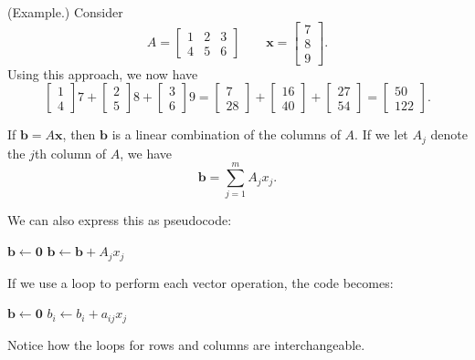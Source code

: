 \documentclass[letterpaper]{article}
\begin{document}
\begin{mdframed}
    (Example.) Consider
    \[A = \begin{bmatrix}
        1 & 2 & 3 \\ 
        4 & 5 & 6
    \end{bmatrix} \qquad \mathbf{x} = \begin{bmatrix}
        7 \\ 8 \\ 9
    \end{bmatrix}.\]
    Using this approach, we now have 
    \[\begin{bmatrix}
        1 \\ 4
    \end{bmatrix} 7 + \begin{bmatrix}
        2 \\ 5
    \end{bmatrix} 8 + \begin{bmatrix}
        3 \\ 6
    \end{bmatrix} 9 = \begin{bmatrix}
        7 \\ 28
    \end{bmatrix} + \begin{bmatrix}
        16 \\ 40
    \end{bmatrix} + \begin{bmatrix}
        27 \\ 54
    \end{bmatrix} = \begin{bmatrix}
        50 \\ 122
    \end{bmatrix}.\]
\end{mdframed}

\begin{proposition}
    If $\mathbf{b} = A\mathbf{x}$, then $\mathbf{b}$ is a linear combination of the columns of $A$. If we let $A_j$ denote the $j$th column of $A$, we have 
    \[\mathbf{b} = \sum_{j = 1}^{m} A_j x_j.\]
\end{proposition}
We can also express this as pseudocode: 
\begin{algorithmic}
    \State $\mathbf{b} \gets \mathbf{0}$
        \State $\mathbf{b} \gets \mathbf{b} + A_j x_j$
    \EndFor
\end{algorithmic}
If we use a loop to perform each vector operation, the code becomes:
\begin{algorithmic}
    \State $\mathbf{b} \gets \mathbf{0}$
            \State $b_i \gets b_i + a_{ij} x_j$
        \EndFor 
    \EndFor
\end{algorithmic}
Notice how the loops for rows and columns are interchangeable.
\end{document}

